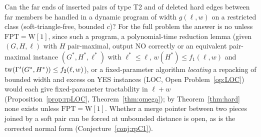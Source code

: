 \begin{problem}\label{op:T2}\label{op:del}\label{op:ML}
Can the far ends of inserted pairs of type T2 and of deleted hard edges between far members be handled in a dynamic program of width $g(\ell,w)$ on a restricted class (soft-triangle-free, bounded $c$)? For the full problem the answer is no unless $\mathrm{FPT}=\mathrm{W[1]}$, since such a program, a polynomial-time reduction lemma (given $(G,H,\ell)$ with $H$ pair-maximal, output NO correctly or an equivalent pair-maximal instance $(G^*,H^*,\ell^*)$ with $\ell^*\le\ell$, $w(H^*)\le f_1(\ell,w)$ and $\mathrm{tw}(\Gamma'(G^*,H^*))\le f_2(\ell,w)$), or a fixed-parameter algorithm \emph{locating} a repacking of bounded width and excess on YES instances (LOC, Open Problem~\ref{op:LOC}) would each give fixed-parameter tractability in $\ell+w$ (Proposition~\ref{prop:rpLOC}, Theorem~\ref{thm:omega}); by Theorem~\ref{thm:hard} none exists unless $\mathrm{FPT}=\mathrm{W[1]}$. Whether a merge pointer between two pieces joined by a soft pair can be forced at unbounded distance is open, as is the corrected normal form (Conjecture~\ref{conj:rpC1}).
\end{problem}
